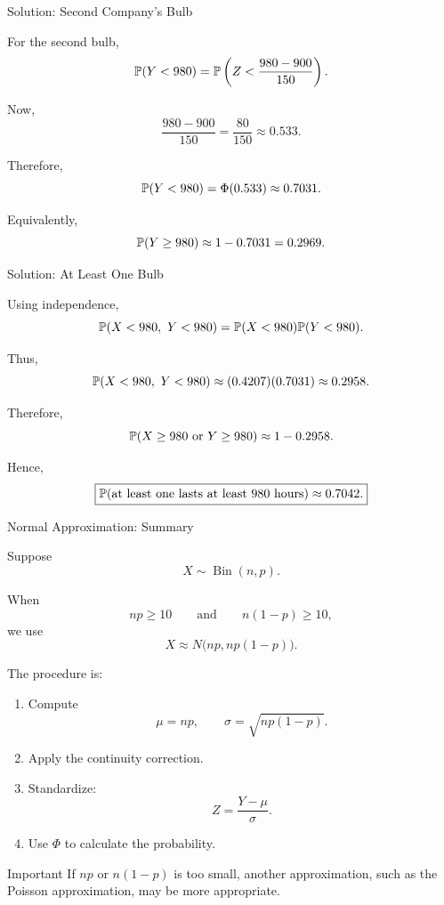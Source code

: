\begin{frame}{Solution: Second Company's Bulb}

For the second bulb,
\[
\mathbb{P}(Y<980)
=
\mathbb{P}\left(
Z<
\frac{980-900}{150}
\right).
\]

Now,
\[
\frac{980-900}{150}
=
\frac{80}{150}
\approx0.533.
\]

Therefore,
\[
\mathbb{P}(Y<980)
=
\Phi(0.533)
\approx0.7031.
\]

Equivalently,
\[
\mathbb{P}(Y\geq980)
\approx
1-0.7031
=
0.2969.
\]

\end{frame}


\begin{frame}{Solution: At Least One Bulb}

Using independence,
\[
\Prob(X<980,\ Y<980)
=
\Prob(X<980)\Prob(Y<980).
\]

Thus,
\[
\mathbb{P}(X<980,\ Y<980)
\approx
(0.4207)(0.7031)
\approx
0.2958.
\]

Therefore,
\[
\Prob(X\geq980\ \text{or}\ Y\geq980)
\approx
1-0.2958.
\]

Hence,
\[
\boxed{
\mathbb{P}(\text{at least one lasts at least \(980\) hours})
\approx0.7042.
}
\]

\end{frame}


\begin{frame}{Normal Approximation: Summary}

Suppose
\[
X\sim\operatorname{Bin}(n,p).
\]

When
\[
np\geq10
\qquad\text{and}\qquad
n(1-p)\geq10,
\]
we use
\[
X\approx N\bigl(np,np(1-p)\bigr).
\]

The procedure is:

\begin{enumerate}
    \item Compute
    \[
    \mu=np,
    \qquad
    \sigma=\sqrt{np(1-p)}.
    \]

    \item Apply the continuity correction.

    \item Standardize:
    \[
    Z=\frac{Y-\mu}{\sigma}.
    \]

    \item Use \(\Phi\) to calculate the probability.
\end{enumerate}

\begin{keybox}{Important}
If \(np\) or \(n(1-p)\) is too small, another approximation, such as the
Poisson approximation, may be more appropriate.
\end{keybox}

\end{frame}







